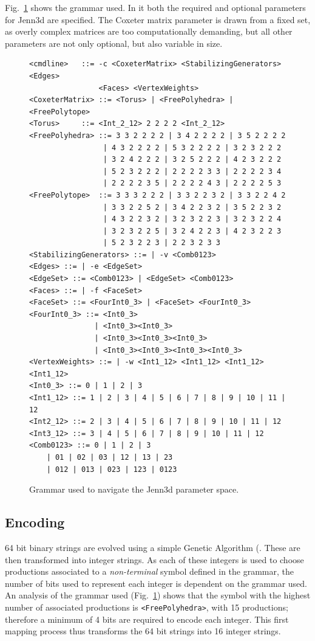 \documentclass{article}
\begin{document}
Fig.~\ref{grammar} shows the grammar used. In it both the required and optional
parameters for Jenn3d are specified. The Coxeter matrix parameter is drawn from
a fixed set, as overly complex matrices are too computationally demanding, but
all other parameters are not only optional, but also variable in size.

\begin{figure}[h!t]
	\begin{verbatim}
<cmdline>	::= -c <CoxeterMatrix> <StabilizingGenerators> <Edges>
                <Faces> <VertexWeights>
<CoxeterMatrix>	::= <Torus> | <FreePolyhedra> | <FreePolytope>
<Torus>		::= <Int_2_12> 2 2 2 2 <Int_2_12>
<FreePolyhedra>	::= 3 3 2 2 2 2 | 3 4 2 2 2 2 | 3 5 2 2 2 2
                 | 4 3 2 2 2 2 | 5 3 2 2 2 2 | 3 2 3 2 2 2
                 | 3 2 4 2 2 2 | 3 2 5 2 2 2 | 4 2 3 2 2 2
                 | 5 2 3 2 2 2 | 2 2 2 2 3 3 | 2 2 2 2 3 4
                 | 2 2 2 2 3 5 | 2 2 2 2 4 3 | 2 2 2 2 5 3
<FreePolytope>	::= 3 3 3 2 2 2 | 3 3 2 2 3 2 | 3 3 2 2 4 2
                 | 3 3 2 2 5 2 | 3 4 2 2 3 2 | 3 5 2 2 3 2
                 | 4 3 2 2 3 2 | 3 2 3 2 2 3 | 3 2 3 2 2 4
                 | 3 2 3 2 2 5 | 3 2 4 2 2 3 | 4 2 3 2 2 3
                 | 5 2 3 2 2 3 | 2 2 3 2 3 3
<StabilizingGenerators> ::= | -v <Comb0123>
<Edges> ::= | -e <EdgeSet>
<EdgeSet> ::= <Comb0123> | <EdgeSet> <Comb0123>
<Faces> ::= | -f <FaceSet>
<FaceSet> ::= <FourInt0_3> | <FaceSet> <FourInt0_3>
<FourInt0_3> ::= <Int0_3>
               | <Int0_3><Int0_3>
               | <Int0_3><Int0_3><Int0_3>
               | <Int0_3><Int0_3><Int0_3><Int0_3>
<VertexWeights> ::= | -w <Int1_12> <Int1_12> <Int1_12> <Int1_12>
<Int0_3> ::= 0 | 1 | 2 | 3
<Int1_12> ::= 1 | 2 | 3 | 4 | 5 | 6 | 7 | 8 | 9 | 10 | 11 | 12
<Int2_12> ::= 2 | 3 | 4 | 5 | 6 | 7 | 8 | 9 | 10 | 11 | 12
<Int3_12> ::= 3 | 4 | 5 | 6 | 7 | 8 | 9 | 10 | 11 | 12
<Comb0123> ::= 0 | 1 | 2 | 3
	| 01 | 02 | 03 | 12 | 13 | 23
	| 012 | 013 | 023 | 123 | 0123
	\end{verbatim}
	\caption{Grammar used to navigate the Jenn3d parameter space.}
	\label{grammar}
\end{figure}

\subsection{Encoding}

64 bit binary strings are evolved using a simple Genetic Algorithm
(\cite{holland75}. These are then transformed into integer strings. As each of
these integers is used to choose productions associated to a
\textit{non-terminal} symbol defined in the grammar, the number of bits used to
represent each integer is dependent on the grammar used. An analysis of the
grammar used (Fig.~\ref{grammar}) shows that the symbol with the highest number
of associated productions is \texttt{<FreePolyhedra>}, with 15 productions;
therefore a minimum of 4 bits are required to encode each integer. This first
mapping process thus transforms the 64 bit strings into 16 integer strings.
\end{document}
